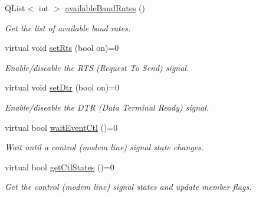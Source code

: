 \begin{DoxyCompactItemize}
\item 
\hypertarget{classmdt_abstract_serial_port_aad267d53be10917396302912af28c4e2}{
QList$<$ int $>$ \hyperlink{classmdt_abstract_serial_port_aad267d53be10917396302912af28c4e2}{availableBaudRates} ()}
\label{classmdt_abstract_serial_port_aad267d53be10917396302912af28c4e2}

\begin{DoxyCompactList}\small\item\em Get the list of available baud rates. \end{DoxyCompactList}\item 
virtual void \hyperlink{classmdt_abstract_serial_port_a0ef2426fbd1afbcb0701f327cc16a7cc}{setRts} (bool on)=0
\begin{DoxyCompactList}\small\item\em Enable/diseable the RTS (Request To Send) signal. \end{DoxyCompactList}\item 
virtual void \hyperlink{classmdt_abstract_serial_port_aa86a8bc0bb03ac2b07bf43968dfeb189}{setDtr} (bool on)=0
\begin{DoxyCompactList}\small\item\em Enable/diseable the DTR (Data Terminal Ready) signal. \end{DoxyCompactList}\item 
virtual bool \hyperlink{classmdt_abstract_serial_port_ac27d1224db349bcf7f161329b5f53efb}{waitEventCtl} ()=0
\begin{DoxyCompactList}\small\item\em Wait until a control (modem line) signal state changes. \end{DoxyCompactList}\item 
virtual bool \hyperlink{classmdt_abstract_serial_port_aaeacd26b220ab0f8c521cef74edfafdd}{getCtlStates} ()=0
\begin{DoxyCompactList}\small\item\em Get the control (modem line) signal states and update member flags. \end{DoxyCompactList}\end{DoxyCompactItemize}
